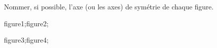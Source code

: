 \documentclass[exercice]{thedocument}%
\begin{document}
%
Nommer, si possible, l'axe (ou les axes) de symétrie de chaque figure.\smallskip\par\noindent
{}\hskip20pt\<figure1;\hskip50pt\hskip20pt\<figure2;\medskip\par\noindent
{}\hskip20pt\<figure3;\hskip50pt\hskip20pt\<figure4;
\end{document}
